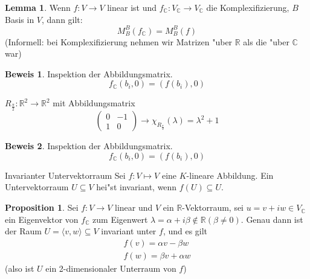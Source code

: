 \documentclass[oneside,fontsize=11pt,paper=a4,BCOR=0mm,DIV=12,automark,headsepline]{scrbook}
\theoremstyle{remark}
\theoremstyle{definition}
\newtheorem*{proposition}{Proposition}
\newtheorem{lemma}{Lemma}[section]
\theoremstyle{definition}
\newtheorem*{prof}{Beweis}
\theoremstyle{remark}
\begin{document}
\begin{lemma}
  Wenn $f: V\to V$ linear ist und \(f_{\mathbb{C}}: V_{\mathbb{C}} \to V_{\mathbb{C}}\) die Komplexifizierung, $B$ Basis
  in $V$, dann gilt: \[M^B_B(f_{\mathbb{C}}) = M^B_B(f)\] (Informell: bei Komplexifizierung nehmen wir Matrizen "uber \(\mathbb{R}\) als die "uber \(\mathbb{C}\) war)
\end{lemma}

\begin{prof}
  Inspektion der Abbildungsmatrix. \[f_{\mathbb{C}}(b_i,0) = (f(b_i), 0)\]
\end{prof}
\begin{exa}
  \(R_{\frac{\pi}{2}}: \mathbb{R}^2\to\mathbb{R}^2\) mit Abbildungsmatrix
  \[
    \begin{pmatrix}
      0 & -1 \\
      1 & 0
    \end{pmatrix}
    \rightarrow \chi_{R_{\frac{\pi}{2}}}(\lambda) = \lambda^2 + 1
  \]
\end{exa}

\begin{prof}
  Inspektion der Abbildungsmatrix. \[f_{\mathbb{C}}(b_i,0) = (f(b_i), 0)\]
\end{prof}

\begin{definition}{Invarianter Untervektorraum}{}
  Sei $f: V \mapsto V$ eine $K$-lineare Abbildung. Ein Untervektorraum
  $U\subseteq V$ hei"st invariant, wenn $f(U) \subseteq U$.
\end{definition}

\begin{proposition}
  Sei \(f: V\to V\) linear und \(V\) ein \(\mathbb{R}\)-Vektorraum, sei \(u = v + i w \in V_{\mathbb{C}}\) ein Eigenvektor von \(f_{\mathbb{C}}\) zum Eigenwert \(\lambda = \alpha + i \beta \not\in \mathbb{R} (\beta \neq 0)\). Genau dann ist der Raum \(U = \langle v, w\rangle\subseteq V\) invariant unter \(f\), und es gilt
  \begin{align*}
    f(v) = \alpha v - \beta w\\
    f(w) = \beta v + \alpha w
  \end{align*}
  (also ist \(U\) ein 2-dimensionaler Unterraum von \(f\))
\end{proposition}
\end{document}
